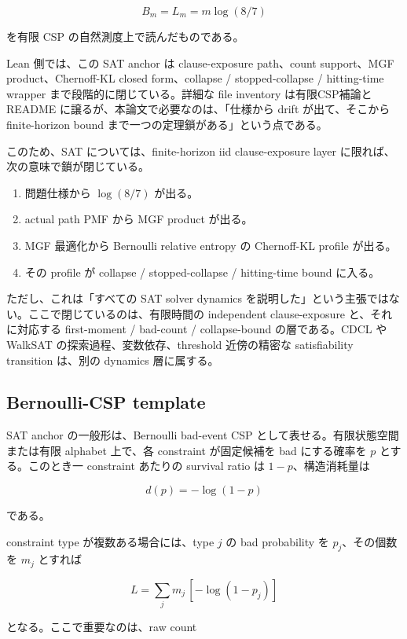 \documentclass[12pt,a4paper]{article}
\begin{document}
\[
B_{m}=L_{m}=m\log(8/7)
\]

を有限 CSP の自然測度上で読んだものである。

Lean 側では、この SAT anchor は clause-exposure path、count support、MGF product、Chernoff-KL closed form、collapse / stopped-collapse / hitting-time wrapper まで段階的に閉じている。詳細な file inventory は有限CSP補論と README に譲るが、本論文で必要なのは、「仕様から drift が出て、そこから finite-horizon bound まで一つの定理鎖がある」という点である。

このため、SAT については、finite-horizon iid clause-exposure layer に限れば、次の意味で鎖が閉じている。

\begin{enumerate}
\def\labelenumi{\arabic{enumi}.}
\tightlist
\item
  問題仕様から \(\log(8/7)\) が出る。
\item
  actual path PMF から MGF product が出る。
\item
  MGF 最適化から Bernoulli relative entropy の Chernoff-KL profile が出る。
\item
  その profile が collapse / stopped-collapse / hitting-time bound に入る。
\end{enumerate}

ただし、これは「すべての SAT solver dynamics を説明した」という主張ではない。ここで閉じているのは、有限時間の independent clause-exposure と、それに対応する first-moment / bad-count / collapse-bound の層である。CDCL や WalkSAT の探索過程、変数依存、threshold 近傍の精密な satisfiability transition は、別の dynamics 層に属する。

\subsection{Bernoulli-CSP template}\label{bernoulli-csp-template}

SAT anchor の一般形は、Bernoulli bad-event CSP として表せる。有限状態空間または有限 alphabet 上で、各 constraint が固定候補を bad にする確率を \(p\) とする。このとき一 constraint あたりの survival ratio は \(1-p\)、構造消耗量は

\[
d(p)=-\log(1-p)
\]

である。

constraint type が複数ある場合には、type \(j\) の bad probability を \(p_{j}\)、その個数を \(m_{j}\) とすれば

\[
L = \sum_{j} m_{j}\,[-\log(1-p_{j})]
\]

となる。ここで重要なのは、raw count
\end{document}
